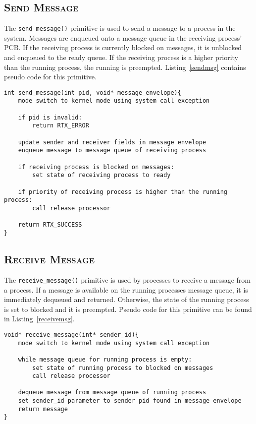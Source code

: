 \documentclass[oneside]{report}
\begin{document}
\subsection{\textsc{Send Message}}

The \texttt{send\_message()} primitive is used to send a message to a
process in the system. Messages are enqueued onto a message queue in
the receiving process' PCB. If the receiving process is currently
blocked on messages, it is unblocked and enqueued to the ready
queue. If the receiving process is a higher priority than the running
process, the running is preempted. Listing~\ref{sendmsg} contains
pseudo code for this primitive.

\begin{lstlisting}
int send_message(int pid, void* message_envelope){
    mode switch to kernel mode using system call exception

    if pid is invalid:
        return RTX_ERROR

    update sender and receiver fields in message envelope
    enqueue message to message queue of receiving process

    if receiving process is blocked on messages:
        set state of receiving process to ready

    if priority of receiving process is higher than the running process:
        call release processor

    return RTX_SUCCESS
}
\end{lstlisting}

\subsection{\textsc{Receive Message}}

The \texttt{receive\_message()} primitive is used by processes to
receive a message from a process. If a message is available on the
running processes message queue, it is immediately dequeued and
returned. Otherwise, the state of the running process is set to
blocked and it is preempted. Pseudo code for this primitive can be
found in Listing~\ref{receivemsg}.

\begin{lstlisting}
void* receive_message(int* sender_id){
    mode switch to kernel mode using system call exception

    while message queue for running process is empty:
        set state of running process to blocked on messages
        call release processor

    dequeue message from message queue of running process
    set sender_id parameter to sender pid found in message envelope
    return message
}
\end{lstlisting}
\end{document}
